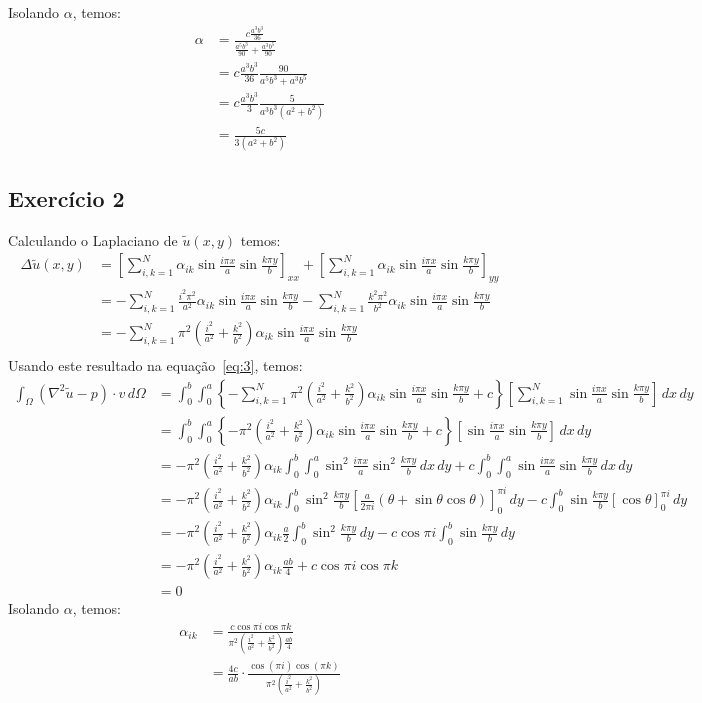 \documentclass[10pt,a4paper]{article}
\begin{document}
	Isolando $\alpha$, temos:
	\begin{align*}
		\alpha  &= \frac{c\frac{a^3b^3}{36}}{\frac{a^5b^3}{90} + \frac{a^3b^5}{90}}\\
		&= c\frac{a^3b^3}{36}\frac{90}{a^5b^3+a^3b^5}\\
		&= c\frac{a^3b^3}{3}\frac{5}{a^3b^3(a^2+b^2)}\\
		&= \frac{5c}{3(a^2+b^2)}
	\end{align*}
	
	\subsection{Exercício 2}
	Calculando o Laplaciano de $\tilde{u}(x,y)$ temos:
	\begin{align*}
		\Delta \tilde{u}(x,y) &= \left[\sum_{i,k=1}^N\alpha_{ik}\sin{\frac{i\pi x}{a}}\sin{\frac{k\pi y}{b}}\right]_{xx} + \left[\sum_{i,k=1}^N\alpha_{ik}\sin{\frac{i\pi x}{a}}\sin{\frac{k\pi y}{b}}\right]_{yy}\\
		&= -\sum_{i,k=1}^N\frac{i^2\pi^2}{a^2}\alpha_{ik}\sin{\frac{i\pi x}{a}}\sin{\frac{k\pi y}{b}} -\sum_{i,k=1}^N\frac{k^2\pi^2}{b^2}\alpha_{ik}\sin{\frac{i\pi x}{a}}\sin{\frac{k\pi y}{b}}\\
		&= -\sum_{i,k=1}^N\pi^2\left(\frac{i^2}{a^2}+\frac{k^2}{b^2}\right)\alpha_{ik}\sin{\frac{i\pi x}{a}}\sin{\frac{k\pi y}{b}}\\
	\end{align*}
	Usando este resultado na equação~\ref{eq:3}, temos:
	\begin{align*}
		\int_\Omega \left(\nabla^2\tilde{u}-p\right)\cdot v\,d\Omega &= \int_0^b \int_0^a \left\{-\sum_{i,k=1}^N\pi^2\left(\frac{i^2}{a^2}+\frac{k^2}{b^2}\right)\alpha_{ik}\sin{\frac{i\pi x}{a}}\sin{\frac{k\pi y}{b}} + c\right\} \left[ \sum_{i,k=1}^N\sin{\frac{i\pi x}{a}}\sin{\frac{k\pi y}{b}} \right] \,dx\,dy\\
&= \int_0^b \int_0^a \left\{-\pi^2\left(\frac{i^2}{a^2}+\frac{k^2}{b^2}\right)\alpha_{ik}\sin{\frac{i\pi x}{a}}\sin{\frac{k\pi y}{b}} + c\right\} \left[ \sin{\frac{i\pi x}{a}}\sin{\frac{k\pi y}{b}} \right] \,dx\,dy\\
&= -\pi^2\left(\frac{i^2}{a^2}+\frac{k^2}{b^2}\right)\alpha_{ik}\int_0^b \int_0^a \sin^2{\frac{i\pi x}{a}}\sin^2{\frac{k\pi y}{b}}\,dx\,dy + c \int_0^b \int_0^a \sin{\frac{i\pi x}{a}}\sin{\frac{k\pi y}{b}} \,dx\,dy\\
&= -\pi^2\left(\frac{i^2}{a^2}+\frac{k^2}{b^2}\right)\alpha_{ik}\int_0^b \sin^2{\frac{k\pi y}{b}}\left[\frac{a}{2\pi i}\left(\theta + \sin{\theta}\cos{\theta}\right)\right]_0^{\pi i}\,dy - c \int_0^b\sin{\frac{k\pi y}{b}}\left[\cos{\theta}\right]_0^{\pi i}\,dy\\
&= -\pi^2\left(\frac{i^2}{a^2}+\frac{k^2}{b^2}\right)\alpha_{ik} \frac{a}{2} \int_0^b \sin^2{\frac{k\pi y}{b}}\,dy - c \cos{\pi i} \int_0^b\sin{\frac{k\pi y}{b}}\,dy\\
&= -\pi^2\left(\frac{i^2}{a^2}+\frac{k^2}{b^2}\right)\alpha_{ik} \frac{ab}{4}+ c \cos{\pi i}\cos{\pi k}\\
&= 0
	\end{align*}
	Isolando $\alpha$, temos:
	\begin{align*}
		\alpha_{ik}  &= \frac{c \cos{\pi i}\cos{\pi k}}{\pi^2\left(\frac{i^2}{a^2}+\frac{k^2}{b^2}\right)\frac{ab}{4}}\\
		&= \frac{4c}{ab}\cdot\frac{\cos{(\pi i)}\cos{(\pi k)}}{\pi^2\left(\frac{i^2}{a^2}+\frac{k^2}{b^2}\right)}\\
	\end{align*}
\end{document}
